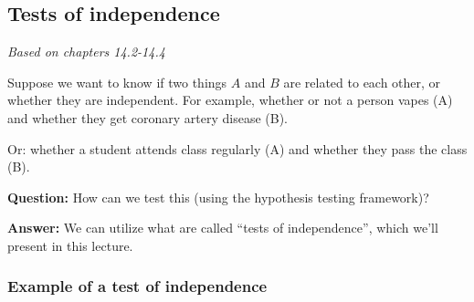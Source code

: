 \documentclass[10pt]{article}
\theoremstyle{definition}
\newtheorem{definition}[theorem]{Definition}
\newcommand{\vt}{\vskip 5mm} %
\newcommand{\Fl}{\vt\noindent\textbf} %
\newcommand{\1}[1]{\textbf{1}_{\left[#1\right]}} %
\def\P{\mathbb{P}} %
\DeclareRobustCommand{\demph}[1]{%
  \ifmmode
  {\color{Blue}#1}%
  \else
  {\color{Blue}\bfseries\slshape #1}%
  \fi
}
\begin{document}


\subsection{Tests of independence}
\textit{Based on chapters 14.2-14.4}

Suppose we want to know if two things $A$ and $B$ are related to each other,
or whether they are independent. For example, whether or not a person vapes
(A) and whether they get coronary artery disease (B).

Or: whether a student attends class regularly (A) and whether they pass the
class (B).

\Fl{Question:} How can we test this (using the hypothesis testing framework)?

\Fl{Answer:} We can utilize what are called ``tests of independence'', which
we'll present in this lecture.

\subsubsection{Example of a test of independence}
\end{document}
